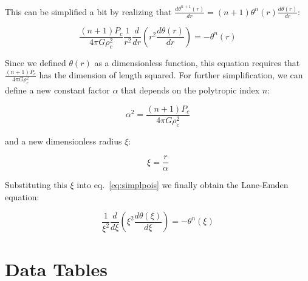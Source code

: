\documentclass[twoside]{article}
\begin{document}
            This can be simplified a bit by realizing that
            \(\frac{d\theta^{n+1}(r)}{dr}=(n+1)\theta^n(r)\frac{d\theta(r)}{dr}\):

            \begin{equation}
                \label{eq:simplpois}
                \frac{(n+1)P_c}{4\pi
                G\rho_c^2}\frac{1}{r^2}\frac{d}{dr}\left(r^2\frac{d\theta(r)}{dr}\right)=-\theta^n(r)
            \end{equation}

            Since we defined \(\theta(r)\) as a dimensionless function, this
            equation requires that \(\frac{(n+1)P_c}{4\pi G\rho_c^2}\) has the
            dimension of length squared. For further simplification, we can
            define a new constant factor \(\alpha\) that depends on the
            polytropic index \(n\):

            \begin{equation}
                \label{eq:alpha}
                \alpha^2=\frac{(n+1)P_c}{4\pi G\rho_c^2}
            \end{equation}

            and a new dimensionless radius \(\xi\):

            \begin{equation}
                \label{eq:xi}
                \xi=\frac{r}{\alpha}
            \end{equation}

            Substituting this \(\xi\) into eq.~\ref{eq:simplpois} we finally
            obtain the Lane-Emden equation:

            \begin{equation}
                \frac{1}{\xi^2}\frac{d}{d\xi}\left(\xi^2\frac{d\theta(\xi)}{d\xi}\right)=-\theta^n(\xi)
            \end{equation}

\section{Data Tables}
\end{document}
